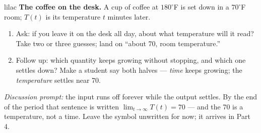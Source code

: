 \documentclass[10pt]{article}
\begin{document}
\begin{skillbox}{lilac}
    \textbf{The coffee on the desk.} A cup of coffee at $180^\circ$F is set down in a
    $70^\circ$F room; $T(t)$ is its temperature $t$ minutes later.
    \begin{enumerate}[itemsep=2pt]
        \item Ask: if you leave it on the desk all day, about what temperature will it read?
              Take two or three guesses; land on ``about 70, room temperature.''
        \item Follow up: which quantity keeps growing without stopping, and which one settles
              down? Make a student say both halves --- \textit{time} keeps growing; the
              \textit{temperature} settles near 70.
    \end{enumerate}
    \textit{Discussion prompt:} the input runs off forever while the output settles. By the end
    of the period that sentence is written $\lim_{t \to \infty} T(t) = 70$ --- and the 70 is a
    temperature, not a time. Leave the symbol unwritten for now; it arrives in Part 4.
\end{skillbox}
\end{document}
